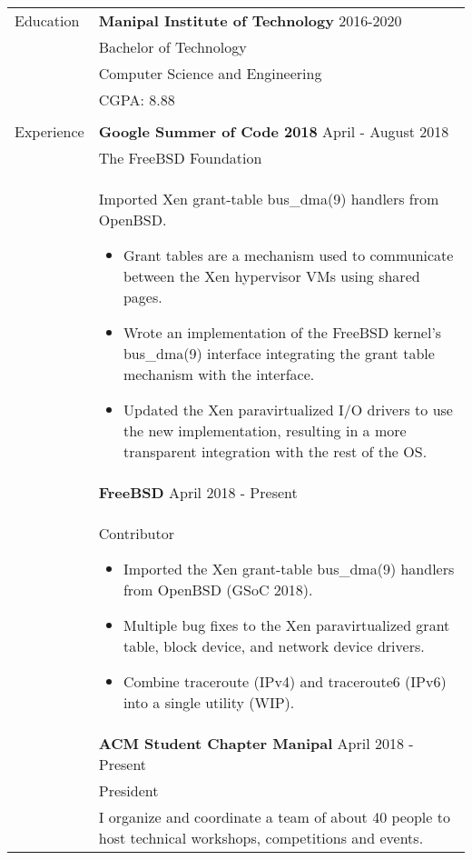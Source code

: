 \documentclass[letterpaper,11pt,oneside]{article}
\begin{document}
\noindent \begin{tabularx}{\textwidth}{l X}
 \Large{Education} & \textbf{Manipal Institute of Technology} \hfill 2016-2020  \\
     & Bachelor of Technology \\
     & Computer Science and Engineering \\
     &  CGPA: 8.88\\
     & \\
 \Large{Experience}    & \textbf{Google Summer of Code 2018} \hfill April - August 2018 \\
    & The FreeBSD Foundation \\
    & Imported Xen grant-table bus\_dma(9) handlers from OpenBSD. \vspace{-1ex}
    \begin{itemize}[label={--}]
    \setlength\itemsep{-0.25em}
        \item Grant tables are a mechanism used to communicate between the Xen hypervisor VMs using shared pages.
        \item Wrote an implementation of the FreeBSD kernel's bus\_dma(9) interface integrating the grant table mechanism with the interface.
        \item Updated the Xen paravirtualized I/O drivers to use the new implementation, resulting in a more transparent integration with the rest of the OS.
    \end{itemize} \\
    & \textbf{FreeBSD} \hfill April 2018 - Present \\
    & Contributor \vspace{-1ex}
    \begin{itemize}[label={--}]
        \setlength\itemsep{-0.25em}
            \item Imported the Xen grant-table bus\_dma(9) handlers from OpenBSD (GSoC 2018).
            \item Multiple bug fixes to the Xen paravirtualized grant table, block device, and network device drivers.
            \item Combine traceroute (IPv4) and traceroute6 (IPv6) into a single utility (WIP).
    \end{itemize} \\
    & \textbf{ACM Student Chapter Manipal} \hfill April 2018 -  Present \\
    & President \\
    & I organize and coordinate a team of about 40 people to host technical workshops, competitions and events. \\

\end{tabularx}
\end{document}
